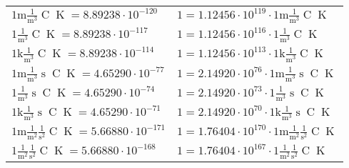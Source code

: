 \begin{center}
\begin{longtable}{l l}
{\color{gray}$1 \bm{\mathrm{ m}}\frac1{\operatorname{m}^3}{}{\operatorname{C}}{\operatorname{K}} = 8.89238\cdot10^{-120} $}   & {\color{gray}$ 1 = 1.12456\cdot10^{119} \cdot 1 \bm{\mathrm{ m}}\frac1{\operatorname{m}^3}{}{\operatorname{C}}{\operatorname{K}}$}  \\
{\color{black}$1 \bm{\mathrm{ }}\frac1{\operatorname{m}^3}{}{\operatorname{C}}{\operatorname{K}} = 8.89238\cdot10^{-117} $}   & {\color{black}$ 1 = 1.12456\cdot10^{116} \cdot 1 \bm{\mathrm{ }}\frac1{\operatorname{m}^3}{}{\operatorname{C}}{\operatorname{K}}$}  \\
{\color{gray}$1 \bm{\mathrm{ k}}\frac1{\operatorname{m}^3}{}{\operatorname{C}}{\operatorname{K}} = 8.89238\cdot10^{-114} $}   & {\color{gray}$ 1 = 1.12456\cdot10^{113} \cdot 1 \bm{\mathrm{ k}}\frac1{\operatorname{m}^3}{}{\operatorname{C}}{\operatorname{K}}$}  \\
{\color{gray}$1 \bm{\mathrm{ m}}\frac1{\operatorname{m}^3}{\operatorname{s}}{\operatorname{C}}{\operatorname{K}} = 4.65290\cdot10^{-77} $}   & {\color{gray}$ 1 = 2.14920\cdot10^{76} \cdot 1 \bm{\mathrm{ m}}\frac1{\operatorname{m}^3}{\operatorname{s}}{\operatorname{C}}{\operatorname{K}}$}  \\
{\color{black}$1 \bm{\mathrm{ }}\frac1{\operatorname{m}^3}{\operatorname{s}}{\operatorname{C}}{\operatorname{K}} = 4.65290\cdot10^{-74} $}   & {\color{black}$ 1 = 2.14920\cdot10^{73} \cdot 1 \bm{\mathrm{ }}\frac1{\operatorname{m}^3}{\operatorname{s}}{\operatorname{C}}{\operatorname{K}}$}  \\
{\color{gray}$1 \bm{\mathrm{ k}}\frac1{\operatorname{m}^3}{\operatorname{s}}{\operatorname{C}}{\operatorname{K}} = 4.65290\cdot10^{-71} $}   & {\color{gray}$ 1 = 2.14920\cdot10^{70} \cdot 1 \bm{\mathrm{ k}}\frac1{\operatorname{m}^3}{\operatorname{s}}{\operatorname{C}}{\operatorname{K}}$}  \\
{\color{gray}$1 \bm{\mathrm{ m}}\frac1{\operatorname{m}^2}\frac1{\operatorname{s}^2}{\operatorname{C}}{\operatorname{K}} = 5.66880\cdot10^{-171} $}   & {\color{gray}$ 1 = 1.76404\cdot10^{170} \cdot 1 \bm{\mathrm{ m}}\frac1{\operatorname{m}^2}\frac1{\operatorname{s}^2}{\operatorname{C}}{\operatorname{K}}$}  \\
{\color{black}$1 \bm{\mathrm{ }}\frac1{\operatorname{m}^2}\frac1{\operatorname{s}^2}{\operatorname{C}}{\operatorname{K}} = 5.66880\cdot10^{-168} $}   & {\color{black}$ 1 = 1.76404\cdot10^{167} \cdot 1 \bm{\mathrm{ }}\frac1{\operatorname{m}^2}\frac1{\operatorname{s}^2}{\operatorname{C}}{\operatorname{K}}$}  \\

\end{longtable}
\end{center}
